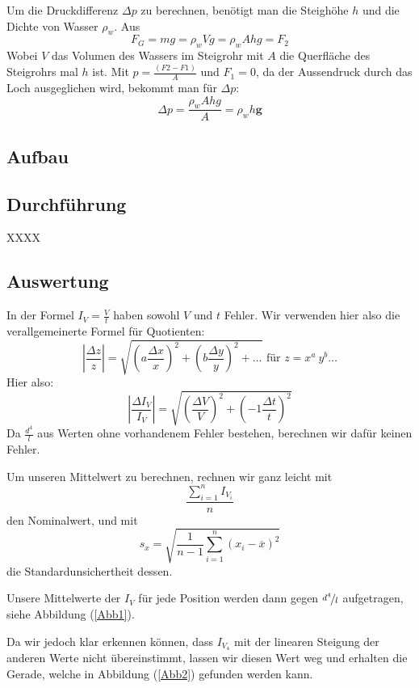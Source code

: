 \documentclass[11pt,a4paper]{article}
\newcommand{\halftime}[4]{\begin{figure}[h]
\begin{minipage}{.#1\textwidth}#3\end{minipage}\begin{minipage}{.#2\textwidth}
\centering
#4\end{minipage}
\end{figure}}
\renewcommand{\vec}{\boldsymbol}
\begin{document}
Um die Druckdifferenz $\Delta p$ zu berechnen, benötigt man die Steighöhe $h$ und die Dichte von Wasser $\rho_w$.
Aus
$$F_G = mg = \rho_w Vg = \rho_w Ahg = F_2$$
Wobei $V$ das Volumen des Wassers im Steigrohr mit $A$ die Querfläche des Steigrohrs mal $h$ ist.
Mit $p = \frac{(F2-F1)}{A}$ und $F_1 = 0$, da der Aussendruck durch das Loch ausgeglichen wird, bekommt man für $\Delta p$:
$$\Delta p = \frac{\rho_w Ahg}{A} = \rho_w h \vec{g}$$


\subsection{Aufbau}


\subsection{Durchführung}

XXXX

\subsection{Auswertung}

In der Formel $I_V=\frac{V}{t}$ haben sowohl $V$ und $t$ Fehler. Wir verwenden hier also die verallgemeinerte Formel f\"ur Quotienten:
$$
\left\vert\frac{\Delta z}{z}\right\vert=\sqrt{\left(a\frac{\Delta x}{x}\right)^2+\left(b\frac{\Delta y}{y}\right)^2+\ldots}\textrm{ f\"ur }z=x^a\ y^b\ldots
$$
Hier also:
$$
\left\vert\frac{\Delta I_V}{I_V}\right\vert=\sqrt{\left(\frac{\Delta V}{V}\right)^2+\left(-1\frac{\Delta t}{t}\right)^2}
$$
Da $\frac{d^4}{l}$ aus Werten ohne vorhandenem Fehler bestehen, berechnen wir daf\"ur keinen Fehler.

Um unseren Mittelwert zu berechnen, rechnen wir ganz leicht mit 
$$
\frac{\sum_{i=1}^n I_{V_i}}{n}
$$
den Nominalwert, und mit
$$
s_x=\sqrt{\frac{1}{n-1}\sum_{i=1}^n(x_i-\overline{x})^2}
$$
die Standardunsichertheit dessen.

Unsere Mittelwerte der $I_V$ f\"ur jede Position werden dann gegen $\nicefrac{d^4}{l}$ aufgetragen, siehe Abbildung (\ref{Abb1}).

Da wir jedoch klar erkennen k\"onnen, dass $I_{V_4}$ mit der linearen Steigung der anderen Werte nicht \"ubereinstimmt, lassen wir diesen Wert weg und erhalten die Gerade, welche in Abbildung (\ref{Abb2}) gefunden werden kann.
\end{document}
